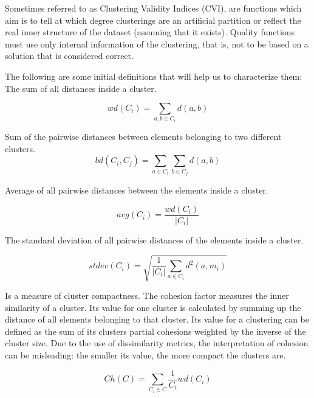Sometimes referred to as Clustering Validity Indices (CVI), are functions
which aim is to tell at which degree clusterings are an artificial
partition or reflect the real inner structure of the dataset (assuming
that it exists). Quality functions must use only internal information
of the clustering, that is, not to be based on a solution that is
considered correct.

The following are some initial definitions that will help us to characterize
them:
 The sum of all distances inside a cluster.

\begin{equation}
wd(C_{i})=\sum_{a,b\in C_{i}}d(a,b)
\end{equation}

 Sum of the pairwise distances between elements
belonging to two different clusters.
\begin{equation}
bd(C_{i},C_{j})=\sum_{a\in C_{i}}\sum_{b\in C_{j}}d(a,b)
\end{equation}

 Average of all pairwise distances between the elements
inside a cluster.

\begin{equation}
avg(C_{i})=\frac{wd(C_{i})}{|C_{i}|}
\end{equation}

 The standard deviation of all
pairwise distances of the elements inside a cluster.

\begin{equation}
stdev(C_{i})=\sqrt{\frac{\text{1}}{|C_{i}|}\sum_{a\in C_{i}}d^{2}(a,m_{i})}
\end{equation}


Is a measure of cluster compactness. The cohesion factor measures
the inner similarity of a cluster. Its value for one cluster is calculated
by summing up the distance of all elements belonging to that cluster.
Its value for a clustering can be defined as the sum of its clusters
partial cohesions weighted by the inverse of the cluster size. Due
to the use of dissimilarity metrics, the interpretation of cohesion
can be misleading: the smaller its value, the more compact the clusters
are.

\begin{equation}
Ch(C)=\sum_{C_{i}\in C}\frac{\text{1}}{C_{i}}wd(C_{i})
\end{equation}


